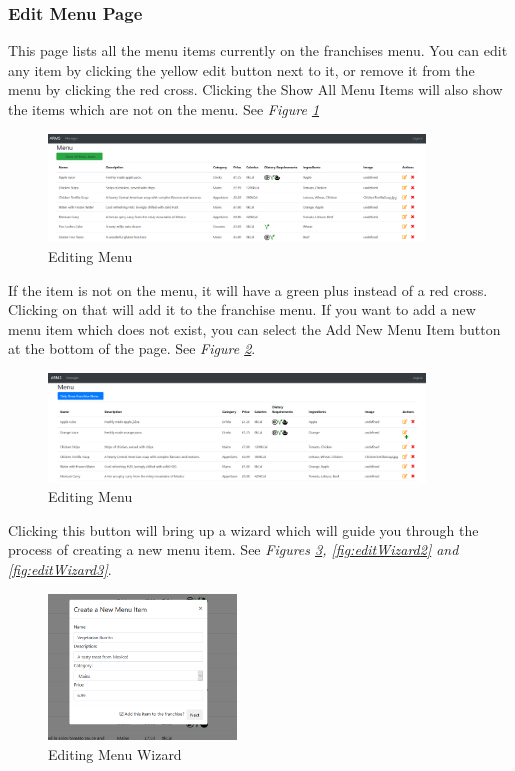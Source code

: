 \documentclass[12pt, twoside, a4paper]{report}
\begin{document}
\subsubsection*{Edit Menu Page}
This page lists all the menu items currently on the franchises menu. You can edit any item by clicking the yellow edit button next to it, or remove it from the menu by clicking the red cross. Clicking the Show All Menu Items will also show the items which are not on the menu. See \textit{Figure \ref{fig:editMenu1}}

\begin{figure}[H]
  \centering
  \includegraphics[width=10cm]{editMenu1.png}
  \caption{Editing Menu}
  \label{fig:editMenu1}
\end{figure}

If the item is not on the menu, it will have a green plus instead of a red cross. Clicking on that will add it to the franchise menu. If you want to add a new menu item which does not exist, you can select the Add New Menu Item button at the bottom of the page.
See \textit{Figure \ref{fig:editMenu2}}.
\begin{figure}[H]
  \centering
  \includegraphics[width=10cm]{editMenu2.png}
  \caption{Editing Menu}
  \label{fig:editMenu2}
\end{figure}

Clicking this button will bring up a wizard which will guide you through the process of creating a new menu item.
See \textit{Figures \ref{fig:editWizard1}, \ref{fig:editWizard2} and \ref{fig:editWizard3}}.

\begin{figure}[H]
  \centering
  \includegraphics[width=5cm]{editWizard1.png}
  \caption{Editing Menu Wizard}
  \label{fig:editWizard1}
\end{figure}
\end{document}
